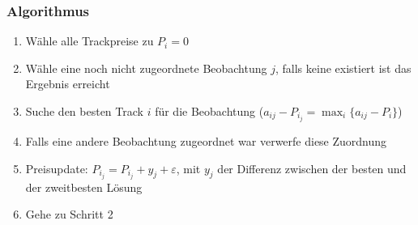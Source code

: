 \subsubsection{Algorithmus}
\begin{enumerate}
    \item Wähle alle Trackpreise zu $P_i=0$
    \item Wähle eine noch nicht zugeordnete Beobachtung $j$, falls keine existiert ist das Ergebnis erreicht
    \item Suche den besten Track $i$ für die Beobachtung ($a_{ij} - P_{i_j} = \max_i \{a_{ij} - P_i\}$)
    \item Falls eine andere Beobachtung zugeordnet war verwerfe diese Zuordnung
    \item Preisupdate: $P_{i_j} = P_{i_j} + y_j + \varepsilon$, mit $y_j$ 
        der Differenz zwischen der besten und der zweitbesten Lösung
    \item Gehe zu Schritt 2
\end{enumerate}
